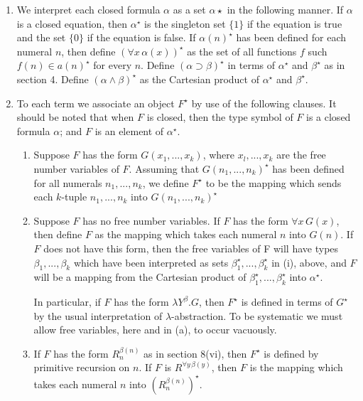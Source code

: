 \documentclass[12pt]{article}
\def\l{\lambda}
\def\limp{\supset}
\def\a{\alpha}
\def\b{\beta}
\def\rbnn{R_n^{\b(n)}}
\begin{document}
\begin{enumerate}[label=(\roman*)]

\item We interpret each closed formula $\a$ as a set $\a\star$ in the following manner. If $\a$
is a closed equation, then $\a^\star$ is the singleton set $\{1\}$ if the equation is true and
the set $\{0\}$ if the equation is false. If $\a(n)^\star$ has been defined for each numeral $n$,
then define $(\forall x\, \a(x))^\star$ as the set of all functions $f$ such $f(n) \in a(n)^\star$ for every $n$.
Define $(\a\limp \b)^\star$ in terms of $\a^\star$ and $\b^\star$ as in section 4. Define $(\a \land \b)^\star$ as the Cartesian
product of $\a^\star$ and $\b^\star$.

\item To each term we associate an object $F^\star$ by use of the following clauses. It
should be noted that when $F$ is closed, then the type symbol of $F$ is a closed
formula $\a$; and $F$ is an element of $\a^\star$.

\begin{enumerate}

\item Suppose $F$ has the form $G(x_1, ... ,x_k)$, where $x_l, ... , x_k$ are the free number
variables of $F$. Assuming that $G(n_1, ... , n_k)^\star$ has been defined for all numerals 
$n_1, ... , n_k$, we define $F^\star$ to be the mapping which sends each $k$-tuple $n_1, ... , n_k$ into
$G(n_1, ... , n_k)^\star$

\item Suppose $F$ has no free number variables. If $F$ has the form $\forall x\, G(x)$, then
define $F$ as the mapping which takes each numeral $n$ into $G(n)$. If $F$ does not
have this form, then the free variables of F will have types $\b_1, ... ,\b_k$ which have
been interpreted as sets $\b_1^\star,...,\b_k^\star$ in (i), above, and $F$ will be a mapping from
the Cartesian product of $\b_1^\star,...,\b_k^\star$ into $\a^\star$.%
\medskip

In particular, if $F$ has the form $\l Y^\b .G$, then $F^\star$ is defined in terms of $G^\star$ by the usual interpretation of $\l$-abstraction. To be systematic we must allow free variables, here and in (a), to occur vacuously.

\item If $F$ has the form $\rbnn$ as in section 8(vi), then $F^\star$ is defined by primitive recursion
on $n$. If $F$ is $R^{\forall y \, \b(y)}$, then $F$ is the mapping which takes each numeral $n$ into $(\rbnn)^\star$.

\end{enumerate}

\end{enumerate}
\end{document}
